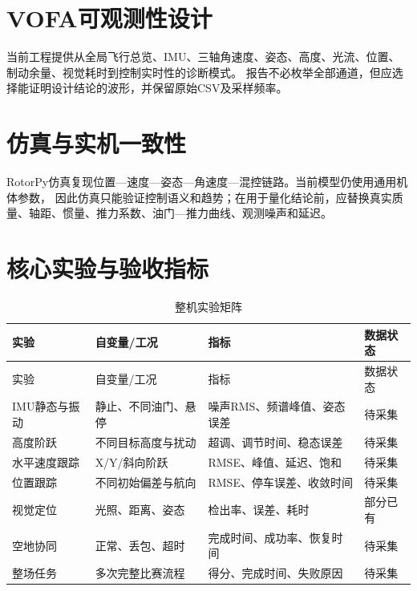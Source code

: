 \section{VOFA可观测性设计}

当前工程提供从全局飞行总览、IMU、三轴角速度、姿态、高度、光流、位置、制动余量、视觉耗时到控制实时性的诊断模式。
报告不必枚举全部通道，但应选择能证明设计结论的波形，并保留原始CSV及采样频率。

\section{仿真与实机一致性}

RotorPy仿真复现位置—速度—姿态—角速度—混控链路。当前模型仍使用通用机体参数，
因此仿真只能验证控制语义和趋势；在用于量化结论前，应替换真实质量、轴距、惯量、推力系数、油门—推力曲线、观测噪声和延迟。

\section{核心实验与验收指标}

\begin{longtable}{p{3.0cm}p{4.0cm}p{3.5cm}p{2.4cm}}
\caption{整机实验矩阵}\label{tab:test-matrix}\\
\toprule
实验 & 自变量/工况 & 指标 & 数据状态 \\
\midrule
\endfirsthead
\toprule
实验 & 自变量/工况 & 指标 & 数据状态 \\
\midrule
\endhead
IMU静态与振动 & 静止、不同油门、悬停 & 噪声RMS、频谱峰值、姿态误差 & 待采集 \\
高度阶跃 & 不同目标高度与扰动 & 超调、调节时间、稳态误差 & 待采集 \\
水平速度跟踪 & X/Y/斜向阶跃 & RMSE、峰值、延迟、饱和 & 待采集 \\
位置跟踪 & 不同初始偏差与航向 & RMSE、停车误差、收敛时间 & 待采集 \\
视觉定位 & 光照、距离、姿态 & 检出率、误差、耗时 & 部分已有 \\
空地协同 & 正常、丢包、超时 & 完成时间、成功率、恢复时间 & 待采集 \\
整场任务 & 多次完整比赛流程 & 得分、完成时间、失败原因 & 待采集 \\
\bottomrule
\end{longtable}

